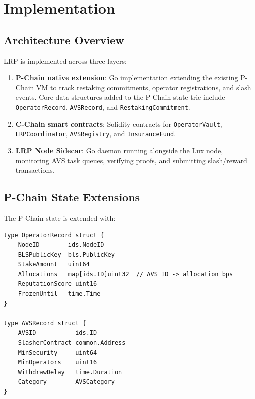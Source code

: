 \documentclass[11pt]{article}
\begin{document}
\section{Implementation}
\label{sec:implementation}

\subsection{Architecture Overview}

LRP is implemented across three layers:

\begin{enumerate}[leftmargin=1.5em]
  \item \textbf{P-Chain native extension}: Go implementation extending the existing P-Chain
    VM to track restaking commitments, operator registrations, and slash events. Core data
    structures added to the P-Chain state trie include \texttt{OperatorRecord},
    \texttt{AVSRecord}, and \texttt{RestakingCommitment}.
  \item \textbf{C-Chain smart contracts}: Solidity contracts for \texttt{OperatorVault},
    \texttt{LRPCoordinator}, \texttt{AVSRegistry}, and \texttt{InsuranceFund}.
  \item \textbf{LRP Node Sidecar}: Go daemon running alongside the Lux node, monitoring
    AVS task queues, verifying proofs, and submitting slash/reward transactions.
\end{enumerate}

\subsection{P-Chain State Extensions}

The P-Chain state is extended with:

\begin{verbatim}
type OperatorRecord struct {
    NodeID        ids.NodeID
    BLSPublicKey  bls.PublicKey
    StakeAmount   uint64
    Allocations   map[ids.ID]uint32  // AVS ID -> allocation bps
    ReputationScore uint16
    FrozenUntil   time.Time
}

type AVSRecord struct {
    AVSID           ids.ID
    SlasherContract common.Address
    MinSecurity     uint64
    MinOperators    uint16
    WithdrawDelay   time.Duration
    Category        AVSCategory
}
\end{verbatim}
\end{document}
